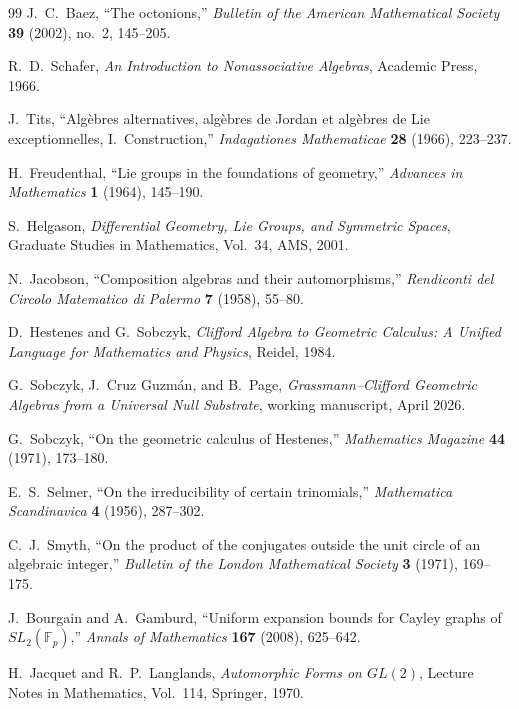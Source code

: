 \documentclass[11pt,a4paper]{article}
\theoremstyle{plain}
\theoremstyle{definition}
\theoremstyle{remark}
\numberwithin{equation}{section}
\providecommand{\F}{\mathbb{F}}
\begin{document}
\begin{thebibliography}{99}
J.~C.~Baez,
``The octonions,''
\emph{Bulletin of the American Mathematical Society} \textbf{39}
(2002), no.~2, 145--205.

R.~D.~Schafer,
\emph{An Introduction to Nonassociative Algebras},
Academic Press, 1966.

J.~Tits,
``Alg\`ebres alternatives, alg\`ebres de Jordan et alg\`ebres de
Lie exceptionnelles, I.~Construction,''
\emph{Indagationes Mathematicae} \textbf{28} (1966), 223--237.

H.~Freudenthal,
``Lie groups in the foundations of geometry,''
\emph{Advances in Mathematics} \textbf{1} (1964), 145--190.

S.~Helgason,
\emph{Differential Geometry, Lie Groups, and Symmetric Spaces},
Graduate Studies in Mathematics, Vol.~34, AMS, 2001.

N.~Jacobson,
``Composition algebras and their automorphisms,''
\emph{Rendiconti del Circolo Matematico di Palermo} \textbf{7}
(1958), 55--80.

D.~Hestenes and G.~Sobczyk,
\emph{Clifford Algebra to Geometric Calculus: A Unified Language
for Mathematics and Physics}, Reidel, 1984.

G.~Sobczyk, J.~Cruz Guzm\'an, and B.~Page,
\emph{Grassmann--Clifford Geometric Algebras from a Universal
Null Substrate}, working manuscript, April 2026.

G.~Sobczyk,
``On the geometric calculus of Hestenes,''
\emph{Mathematics Magazine} \textbf{44} (1971), 173--180.

E.~S.~Selmer,
``On the irreducibility of certain trinomials,''
\emph{Mathematica Scandinavica} \textbf{4} (1956), 287--302.

C.~J.~Smyth,
``On the product of the conjugates outside the unit circle of an
algebraic integer,''
\emph{Bulletin of the London Mathematical Society} \textbf{3}
(1971), 169--175.

J.~Bourgain and A.~Gamburd,
``Uniform expansion bounds for Cayley graphs of $SL_2(\F_p)$,''
\emph{Annals of Mathematics} \textbf{167} (2008), 625--642.

H.~Jacquet and R.~P.~Langlands,
\emph{Automorphic Forms on $GL(2)$},
Lecture Notes in Mathematics, Vol.~114, Springer, 1970.


\end{thebibliography}
\end{document}
